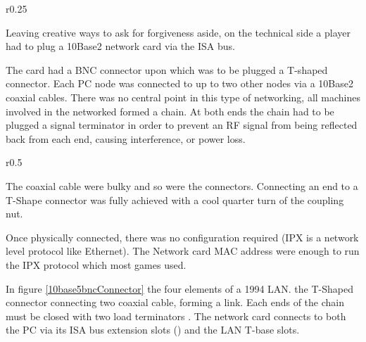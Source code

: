 \begin{wrapfigure}[7]{r}{0.25\textwidth}
\centering
{}
\end{wrapfigure}

Leaving creative ways to ask for forgiveness aside, on the technical side a player had to plug a 10Base2 network card via the ISA bus. \\
\par The card had a BNC connector upon which was to be plugged a T-shaped connector. Each PC node was connected to up to two other nodes via a 10Base2 coaxial cables. There was no central point in this type of networking, all machines involved in the networked formed a chain. At both ends the chain had to be plugged a signal terminator in order to prevent an RF signal from being reflected back from each end, causing interference, or power loss.


\begin{wrapfigure}[11]{r}{0.5\textwidth}
\centering
{}
\end{wrapfigure}
The coaxial cable were bulky and so were the connectors. Connecting an end to a T-Shape connector was fully achieved with a cool quarter turn of the coupling nut.\\
\par
 Once physically connected, there was no configuration required (IPX is a network level protocol like Ethernet). The Network card MAC address were enough to run the IPX protocol which most games used.\\
 \par
{}
\par
In figure \ref{10base5bncConnector} the four elements of a 1994 LAN.  the T-Shaped connector connecting two  coaxial cable, forming a link. Each ends of the chain must be closed with two load terminators . The network card connects to both the PC via its ISA bus extension slots () and the LAN T-base slots.\\
\par
{}\\
\par
{}









